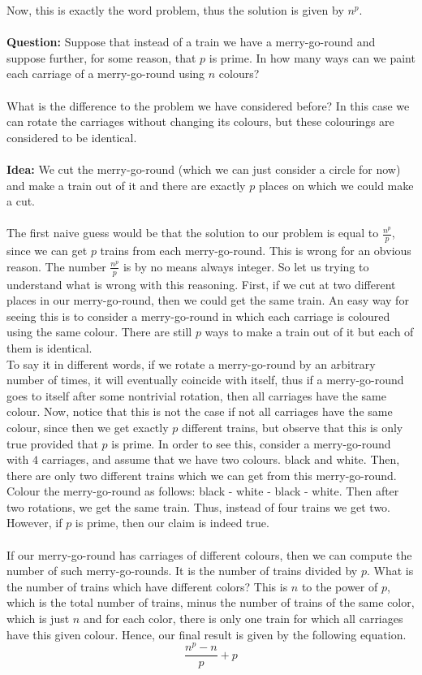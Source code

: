 Now, this is exactly the word problem, thus the solution is given by $n^p$.
\\
\\
\noindent
\textbf{Question:} Suppose that instead of a train we have a merry-go-round and suppose further, for some reason, that $p$ is prime. 
In how many ways can we paint each carriage of a merry-go-round using $n$ colours?
\\
\\
\noindent
What is the difference to the problem we have considered before? In this case we can rotate the carriages without changing its colours, but these colourings are considered to be identical.
\\
\\
\textbf{Idea:} We cut the merry-go-round (which we can just consider a circle for now) and make a train out of it and there are exactly $p$ places on which we could make a cut.
\\
\\
The first naive guess would be that the solution to our problem is equal to $\frac{n^p}{p}$, since we can get $p$ trains from each merry-go-round. This is wrong for an obvious reason. The number $\frac{n^p}{p}$
is by no means always integer. So let us trying to understand what is wrong with this reasoning. First, if we cut at two different places in our merry-go-round, then we could get the same train. An easy way for seeing this
is to consider a merry-go-round in which each carriage is coloured using the same colour. There are still $p$ ways to make a train out of it but each of them is identical.
\\
To say it in different words, if we rotate a merry-go-round by an arbitrary number of times, it will eventually coincide with itself, thus if a merry-go-round goes to itself after some nontrivial rotation, then all carriages have the same colour.
Now, notice that this is not the case if not all carriages have the same colour, since then we get exactly $p$ different trains, but observe that this is only true provided that $p$ is prime. In order to see this, consider a merry-go-round with $4$ carriages,
and assume that we have two colours. black and white. Then, there are only two different trains which we can get from this merry-go-round. Colour the merry-go-round as follows: black - white - black - white. Then after two rotations, we get the same train. Thus, 
instead of four trains we get two. However, if $p$ is prime, then our claim is indeed true.
\\
\\
If our merry-go-round has carriages of different colours, then we can compute the number of such merry-go-rounds.
It is the number of trains divided by $p$. What is the number of trains which have different colors?
This is $n$ to the power of $p$, which is the total number of trains, minus the number of trains of the same color, which is just $n$ and for each color, there is only one train for which all carriages have this given colour.
Hence, our final result is given by the following equation.
$$
\frac{n^p-n}{p} + p
$$

